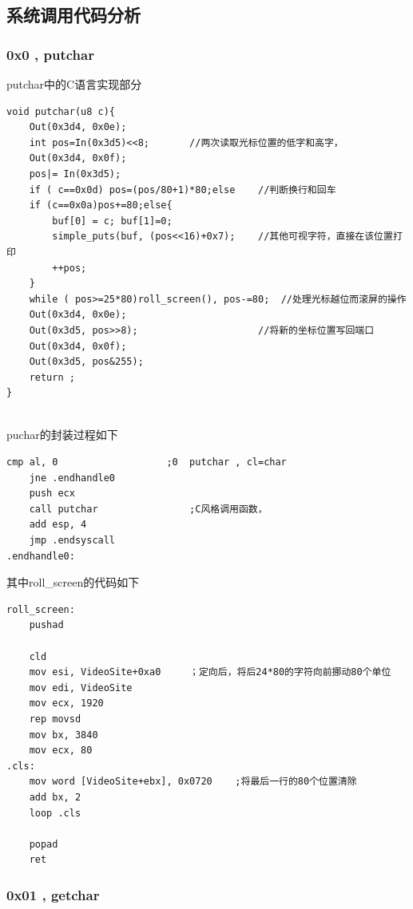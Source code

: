 \documentclass[a4paper,11pt,UTF8]{ctexart}
\begin{document}
	\subsection{系统调用代码分析}

		\subsubsection{0x0 , putchar}
	putchar中的C语言实现部分
		\begin{lstlisting}[language={[ANSI]C},keywordstyle=\color{blue!70},commentstyle=\color{red!50!green!50!blue!50},frame=shadowbox, rulesepcolor=\color{red!20!green!20!blue!20}]
void putchar(u8 c){
	Out(0x3d4, 0x0e);		
	int pos=In(0x3d5)<<8;		//两次读取光标位置的低字和高字，
	Out(0x3d4, 0x0f);
	pos|= In(0x3d5);
	if ( c==0x0d) pos=(pos/80+1)*80;else	//判断换行和回车
	if (c==0x0a)pos+=80;else{
		buf[0] = c; buf[1]=0;
		simple_puts(buf, (pos<<16)+0x7);	//其他可视字符，直接在该位置打印
		++pos;
	}
	while ( pos>=25*80)roll_screen(), pos-=80;	//处理光标越位而滚屏的操作
	Out(0x3d4, 0x0e);
	Out(0x3d5, pos>>8);						//将新的坐标位置写回端口
	Out(0x3d4, 0x0f);
	Out(0x3d5, pos&255);
	return ;
}
			
			\end{lstlisting}
		puchar的封装过程如下
		\begin{lstlisting}[language=={[x86masm]Assembler}keywordstyle=\color{blue!70},commentstyle=\color{red!50!green!50!blue!50},frame=shadowbox, rulesepcolor=\color{red!20!green!20!blue!20}]
	cmp al, 0					;0  putchar , cl=char
	jne	.endhandle0
	push ecx
	call putchar				;C风格调用函数，
	add esp, 4
	jmp .endsyscall
.endhandle0:
		\end{lstlisting}
		其中roll\_screen的代码如下
		\begin{lstlisting}[language=={[x86masm]Assembler}keywordstyle=\color{blue!70},commentstyle=\color{red!50!green!50!blue!50},frame=shadowbox, rulesepcolor=\color{red!20!green!20!blue!20}]
	roll_screen:
	pushad

	cld
	mov esi, VideoSite+0xa0		；定向后，将后24*80的字符向前挪动80个单位
	mov edi, VideoSite
	mov ecx, 1920
	rep movsd
	mov bx, 3840
	mov ecx, 80
.cls:
	mov word [VideoSite+ebx], 0x0720	;将最后一行的80个位置清除
	add bx, 2
	loop .cls
	
	popad
	ret
		\end{lstlisting}

		\subsubsection{0x01 , getchar}
\end{document}
